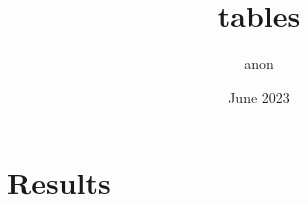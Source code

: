 \documentclass{article}
\title{tables}
\author{anon}
\date{June 2023}
\begin{document}
\maketitle

\section{Results}


\end{document}
